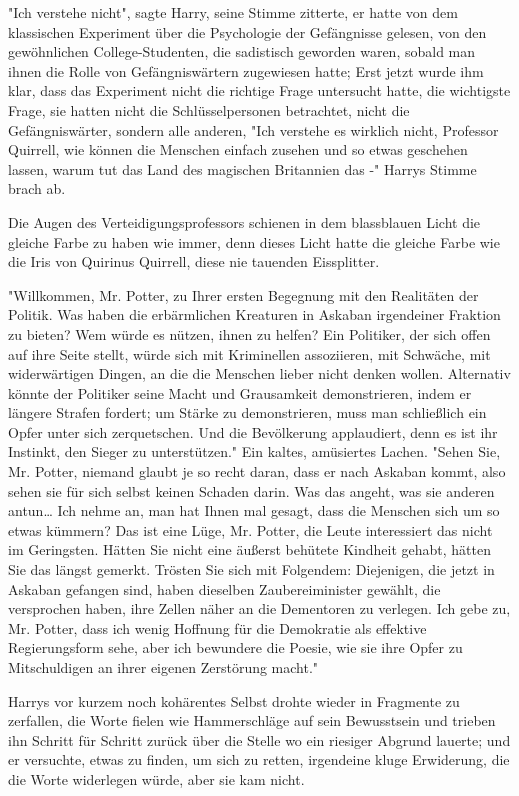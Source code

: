 {"Ich verstehe nicht", sagte Harry, seine Stimme zitterte, er hatte von dem klassischen Experiment über die Psychologie der Gefängnisse gelesen, von den gewöhnlichen College-Studenten, die sadistisch geworden waren, sobald man ihnen die Rolle von Gefängniswärtern zugewiesen hatte; Erst jetzt wurde ihm klar, dass das Experiment nicht die richtige Frage untersucht hatte, die wichtigste Frage, sie hatten nicht die Schlüsselpersonen betrachtet, nicht die Gefängniswärter, sondern alle anderen, "Ich verstehe es wirklich nicht, Professor Quirrell, wie können die Menschen einfach zusehen und so etwas geschehen lassen, warum tut das Land des magischen Britannien das -" Harrys Stimme brach ab.

Die Augen des Verteidigungsprofessors schienen in dem blassblauen Licht die gleiche Farbe zu haben wie immer, denn dieses Licht hatte die gleiche Farbe wie die Iris von Quirinus Quirrell, diese nie tauenden Eissplitter.

"Willkommen, Mr. Potter, zu Ihrer ersten Begegnung mit den Realitäten der Politik. Was haben die erbärmlichen Kreaturen in Askaban irgendeiner Fraktion zu bieten? Wem würde es nützen, ihnen zu helfen? Ein Politiker, der sich offen auf ihre Seite stellt, würde sich mit Kriminellen assoziieren, mit Schwäche, mit widerwärtigen Dingen, an die die Menschen lieber nicht denken wollen. Alternativ könnte der Politiker seine Macht und Grausamkeit demonstrieren, indem er längere Strafen fordert; um Stärke zu demonstrieren, muss man schließlich ein Opfer unter sich zerquetschen. Und die Bevölkerung applaudiert, denn es ist ihr Instinkt, den Sieger zu unterstützen." Ein kaltes, amüsiertes Lachen. "Sehen Sie, Mr. Potter, niemand glaubt je so recht daran, dass er nach Askaban kommt, also sehen sie für sich selbst keinen Schaden darin. Was das angeht, was sie anderen antun… Ich nehme an, man hat Ihnen mal gesagt, dass die Menschen sich um so etwas kümmern? Das ist eine Lüge, Mr. Potter, die Leute interessiert das nicht im Geringsten. Hätten Sie nicht eine äußerst behütete Kindheit gehabt, hätten Sie das längst gemerkt. Trösten Sie sich mit Folgendem: Diejenigen, die jetzt in Askaban gefangen sind, haben dieselben Zaubereiminister gewählt, die versprochen haben, ihre Zellen näher an die Dementoren zu verlegen. Ich gebe zu, Mr. Potter, dass ich wenig Hoffnung für die Demokratie als effektive Regierungsform sehe, aber ich bewundere die Poesie, wie sie ihre Opfer zu Mitschuldigen an ihrer eigenen Zerstörung macht."

Harrys vor kurzem noch kohärentes Selbst drohte wieder in Fragmente zu zerfallen, die Worte fielen wie Hammerschläge auf sein Bewusstsein und trieben ihn Schritt für Schritt zurück über die Stelle wo ein riesiger Abgrund lauerte; und er versuchte, etwas zu finden, um sich zu retten, irgendeine kluge Erwiderung, die die Worte widerlegen würde, aber sie kam nicht.

}
